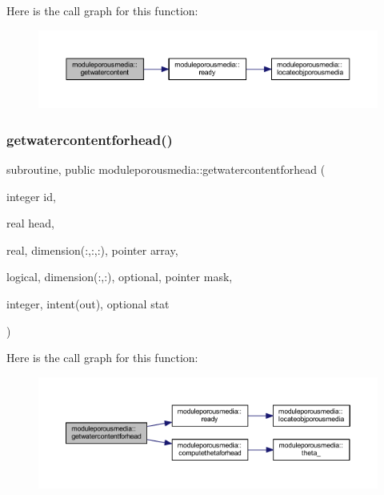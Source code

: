 Here is the call graph for this function\+:\nopagebreak
\begin{figure}[H]
\begin{center}
\leavevmode
\includegraphics[width=350pt]{namespacemoduleporousmedia_a5b9d7f2adce9fea213bdc41bdb432a9f_cgraph}
\end{center}
\end{figure}
\mbox{\label{namespacemoduleporousmedia_ab9c801f3c5442ad39e9dcb57a60fe017}} 
\subsubsection{\texorpdfstring{getwatercontentforhead()}{getwatercontentforhead()}}
{\footnotesize\ttfamily subroutine, public moduleporousmedia\+::getwatercontentforhead (\begin{DoxyParamCaption}\item[{integer}]{id,  }\item[{real}]{head,  }\item[{real, dimension(\+:,\+:,\+:), pointer}]{array,  }\item[{logical, dimension(\+:,\+:), optional, pointer}]{mask,  }\item[{integer, intent(out), optional}]{stat }\end{DoxyParamCaption})}

Here is the call graph for this function\+:\nopagebreak
\begin{figure}[H]
\begin{center}
\leavevmode
\includegraphics[width=350pt]{namespacemoduleporousmedia_ab9c801f3c5442ad39e9dcb57a60fe017_cgraph}
\end{center}
\end{figure}
\mbox{\label{namespacemoduleporousmedia_a8bee2fc4ac5baf4e997680a0b63e34b3}} 
